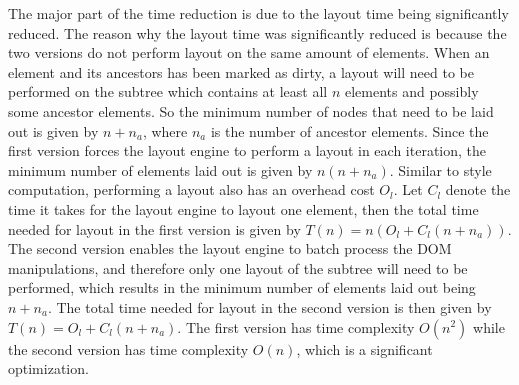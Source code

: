 \documentclass[a4paper,11pt]{kth-mag}
\begin{document}
        The major part of the time reduction is due to the layout time being significantly reduced.
        The reason why the layout time was significantly reduced is because the two versions do not perform layout on the same amount of elements.
        When an element and its ancestors has been marked as dirty, a layout will need to be performed on the subtree which contains at least all $n$ elements and possibly some ancestor elements.
        So the minimum number of nodes that need to be laid out is given by $n + n_{a}$, where $n_a$ is the number of ancestor elements.
        Since the first version forces the layout engine to perform a layout in each iteration, the minimum number of elements laid out is given by $n(n + n_a)$.
        Similar to style computation, performing a layout also has an overhead cost $O_{l}$.
        Let $C_{l}$ denote the time it takes for the layout engine to layout one element, then the total time needed for layout in the first version is given by $T(n) = n(O_{l} + C_{l}(n + n_a))$.
        The second version enables the layout engine to batch process the \gls{DOM} manipulations, and therefore only one layout of the subtree will need to be performed, which results in the minimum number of elements laid out being $n + n_a$.
        The total time needed for layout in the second version is then given by $T(n) = O_{l} + C_{l}(n + n_a)$.
        The first version has time complexity $O(n^2)$ while the second version has time complexity $O(n)$, which is a significant optimization.


\end{document}

